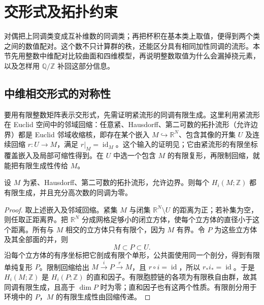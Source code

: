 
% 
% 
% 

\section{交形式及拓扑约束}
\label{g2:sec:0605}

对偶把上同调类变成互补维数的同调类；再把杯积在基本类上取值，便得到两个类之间的数值配对。这个数不只计算群的秩，还能区分具有相同加性同调的流形。本节先用整数中维配对比较曲面和四维模型，再说明整数取值为什么会漏掉挠元素，以及怎样用 \(\mathbb Q/\mathbb Z\) 补回这部分信息。

\subsection{中维相交形式的对称性}
\label{g2:subsec:0605:01}
要用有限整数矩阵表示交形式，先需证明紧流形的同调有限生成。这里利用紧流形在 Euclid 空间中的邻域回缩：任意紧、Hausdorff、第二可数的拓扑流形（允许边界）都是 Euclid 邻域收缩核，即存在某个嵌入 \(M\hookrightarrow\mathbb R^N\)、包含其像的开集 \(U\) 及连续回缩 \(r:U\to M\)，满足 \(r|_M=\operatorname{id}_M\)。这个输入的证明见\cite[附录A，Euclidean Neighborhood Retracts]{Hatcher2002}；它由紧流形的有限坐标覆盖嵌入及局部可缩性得到。在 \(U\) 中选一个包含 \(M\) 的有限复形，再限制回缩，就能把有限生成性传给 \(M\)。

\begin{lemma}\label{g2:lem:compact-manifold-finite-homology}
	设 \(M\) 为紧、Hausdorff、第二可数的拓扑流形，允许边界。则每个 \(H_i(M;\mathbb Z)\) 都有限生成，并且充分高次数的同调为零。
\end{lemma}
\begin{proof}
	取上述嵌入及邻域回缩。紧集 \(M\) 与闭集 \(\mathbb R^N\setminus U\) 的距离为正；若补集为空，则任取正距离界。把 \(\mathbb R^N\) 分成网格足够小的闭立方体，使每个立方体的直径小于这个距离。所有与 \(M\) 相交的立方体只有有限个，因为 \(M\) 有界。令 \(P\) 为这些立方体及其全部面的并，则
	\[
		M\subset P\subset U.
	\]
	沿每个立方体的有序坐标把它剖成有限个单形，公共面使用同一个剖分，得到有限单纯复形 \(P\)。限制回缩给出 \(M\xrightarrow{i}P\xrightarrow{r}M\)，且 \(r\circ i=\operatorname{id}\)，所以 \(r_*i_*=\operatorname{id}\)。于是 \(H_i(M;\mathbb Z)\) 是 \(H_i(P;\mathbb Z)\) 的直和因子。有限胞腔链的各项为有限秩自由群，故其同调有限生成，且高于 \(\dim P\) 时为零；直和因子也有这两个性质。有限剖分用于环境中的 \(P\)，\(M\) 的有限生成性由回缩传递。
\end{proof}

